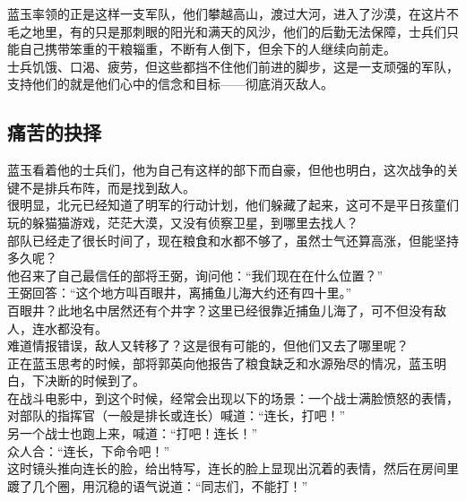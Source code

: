 \begin{multicols}{\theparacolNo}
蓝玉率领的正是这样一支军队，他们攀越高山，渡过大河，进入了沙漠，在这片不毛之地里，有的只是那刺眼的阳光和满天的风沙，他们的后勤无法保障，士兵们只能自己携带笨重的干粮辎重，不断有人倒下，但余下的人继续向前走。\\

士兵饥饿、口渴、疲劳，但这些都挡不住他们前进的脚步，这是一支顽强的军队，支持他们的就是他们心中的信念和目标——彻底消灭敌人。\\

\subsection{痛苦的抉择}
蓝玉看着他的士兵们，他为自己有这样的部下而自豪，但他也明白，这次战争的关键不是排兵布阵，而是找到敌人。\\

很明显，北元已经知道了明军的行动计划，他们躲藏了起来，这可不是平日孩童们玩的躲猫猫游戏，茫茫大漠，又没有侦察卫星，到哪里去找人？\\

部队已经走了很长时间了，现在粮食和水都不够了，虽然士气还算高涨，但能坚持多久呢？\\

他召来了自己最信任的部将王弼，询问他：“我们现在在什么位置？”\\

王弼回答：“这个地方叫百眼井，离捕鱼儿海大约还有四十里。”\\

百眼井？此地名中居然还有个井字？这里已经很靠近捕鱼儿海了，可不但没有敌人，连水都没有。\\

难道情报错误，敌人又转移了？这是很有可能的，但他们又去了哪里呢？\\

正在蓝玉思考的时候，部将郭英向他报告了粮食缺乏和水源殆尽的情况，蓝玉明白，下决断的时候到了。\\

在战斗电影中，到这个时候，经常会出现以下的场景：一个战士满脸愤怒的表情，对部队的指挥官（一般是排长或连长）喊道：“连长，打吧！”\\

另一个战士也跑上来，喊道：“打吧！连长！”\\

众人合：“连长，下命令吧！”\\

这时镜头推向连长的脸，给出特写，连长的脸上显现出沉着的表情，然后在房间里踱了几个圈，用沉稳的语气说道：“同志们，不能打！”\\


\end{multicols}
